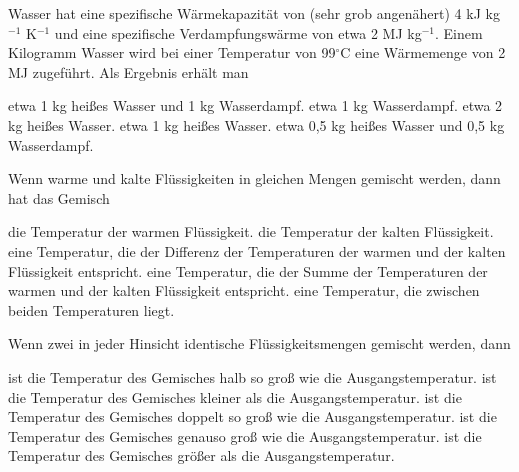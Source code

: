 \documentclass[11pt]{exam}
\begin{document}
\setlength{\voffset}{-0.5in}
\setlength{\headsep}{5pt}

\hspace{2mm}
 \hspace{5mm}
\vspace{4mm}

\begin{questions}

\question Wasser hat eine spezifische Wärmekapazität von (sehr grob angenähert) 4 kJ kg\(^{-1}\) K\(^{-1}\) und eine spezifische Verdampfungswärme von etwa 2 MJ kg\(^{-1}\). Einem Kilogramm Wasser wird bei einer Temperatur von 99\(^\circ\)C eine Wärmemenge von 2 MJ zugeführt. Als Ergebnis erhält man

\begin{choices}
	\choice etwa 1 kg heißes Wasser und 1 kg Wasserdampf.
	\choice etwa 1 kg Wasserdampf.
	\choice etwa 2 kg heißes Wasser.
	\choice etwa 1 kg heißes Wasser.
	\choice etwa 0,5 kg heißes Wasser und 0,5 kg Wasserdampf.
\end{choices}

\vspace{3mm}\question Wenn warme und kalte Flüssigkeiten in gleichen Mengen gemischt werden, dann hat das Gemisch

\begin{choices}
	\choice die Temperatur der warmen Flüssigkeit.
	\choice die Temperatur der kalten Flüssigkeit.
	\choice eine Temperatur, die der Differenz der Temperaturen der warmen und der kalten Flüssigkeit entspricht.
	\choice eine Temperatur, die der Summe der Temperaturen der warmen und der kalten Flüssigkeit entspricht.
	\choice eine Temperatur, die zwischen beiden Temperaturen liegt.
\end{choices}

\vspace{3mm}\question Wenn zwei in jeder Hinsicht identische Flüssigkeitsmengen gemischt werden, dann

\begin{choices}
	\choice ist die Temperatur des Gemisches halb so groß wie die Ausgangstemperatur.
	\choice ist die Temperatur des Gemisches kleiner als die Ausgangstemperatur.
	\choice ist die Temperatur des Gemisches doppelt so groß wie die Ausgangstemperatur.
	\choice ist die Temperatur des Gemisches genauso groß wie die Ausgangstemperatur.
	\choice ist die Temperatur des Gemisches größer als die Ausgangstemperatur.
\end{choices}


\end{questions}
\end{document}
